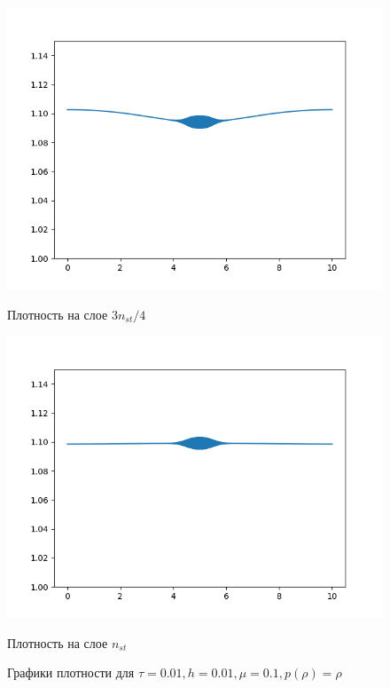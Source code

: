 \begin{figure}[h]
\begin{minipage}[h]{0.47\linewidth}
		\includegraphics[width=1\linewidth]{pics/task2/34h_1.png} 
		\caption{Плотность на слое $3n_{st} / 4$}
	\end{minipage}
	\hfill
	\begin{minipage}[h]{0.47\linewidth}
		\centering
		\includegraphics[width=1\linewidth]{pics/task2/44h_1.png} 
		\caption{Плотность на слое $n_{st}$}
	\end{minipage}
	\caption{Графики плотности для $\tau = 0.01, h = 0.01, \mu = 0.1, p(\rho) = \rho$}
\end{figure}

